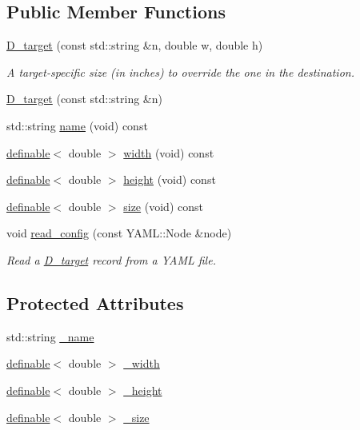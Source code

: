 \subsection*{Public Member Functions}
\begin{DoxyCompactItemize}
\item 
\hyperlink{class_photo_finish_1_1_d__target_aa83bf826478d54de26ca1abad6988a7c}{D\+\_\+target} (const std\+::string \&n, double w, double h)
\begin{DoxyCompactList}\small\item\em A target-\/specific size (in inches) to override the one in the destination. \end{DoxyCompactList}\item 
\hyperlink{class_photo_finish_1_1_d__target_a9aee6452b1a9bcc76b98b7a33bde4b06}{D\+\_\+target} (const std\+::string \&n)
\item 
std\+::string \hyperlink{class_photo_finish_1_1_d__target_a93afbe63cd4deef0e714c3abc0e9b1db}{name} (void) const
\item 
\hyperlink{class_photo_finish_1_1definable}{definable}$<$ double $>$ \hyperlink{class_photo_finish_1_1_d__target_a86393059cd03a3157700ca20c9e8ebaa}{width} (void) const
\item 
\hyperlink{class_photo_finish_1_1definable}{definable}$<$ double $>$ \hyperlink{class_photo_finish_1_1_d__target_a03f87d787b34742a2bca4da14dfe3ce6}{height} (void) const
\item 
\hyperlink{class_photo_finish_1_1definable}{definable}$<$ double $>$ \hyperlink{class_photo_finish_1_1_d__target_ae004b2160f09fcfdac83e730e3595d42}{size} (void) const
\item 
void \hyperlink{class_photo_finish_1_1_d__target_a7a5dce723f5908c120134bf95f2d252d}{read\+\_\+config} (const Y\+A\+M\+L\+::\+Node \&node)
\begin{DoxyCompactList}\small\item\em Read a \hyperlink{class_photo_finish_1_1_d__target}{D\+\_\+target} record from a Y\+A\+ML file. \end{DoxyCompactList}\end{DoxyCompactItemize}
\subsection*{Protected Attributes}
\begin{DoxyCompactItemize}
\item 
std\+::string \hyperlink{class_photo_finish_1_1_d__target_ab70a95f3783cbacedbf39cfe926597f5}{\+\_\+name}
\item 
\hyperlink{class_photo_finish_1_1definable}{definable}$<$ double $>$ \hyperlink{class_photo_finish_1_1_d__target_a37ea9e183740b61400700800fd021486}{\+\_\+width}
\item 
\hyperlink{class_photo_finish_1_1definable}{definable}$<$ double $>$ \hyperlink{class_photo_finish_1_1_d__target_a2699d451750f763590b77babec759d2b}{\+\_\+height}
\item 
\hyperlink{class_photo_finish_1_1definable}{definable}$<$ double $>$ \hyperlink{class_photo_finish_1_1_d__target_ac27d46535ce4532ffba4851c1f7f553c}{\+\_\+size}
\end{DoxyCompactItemize}


